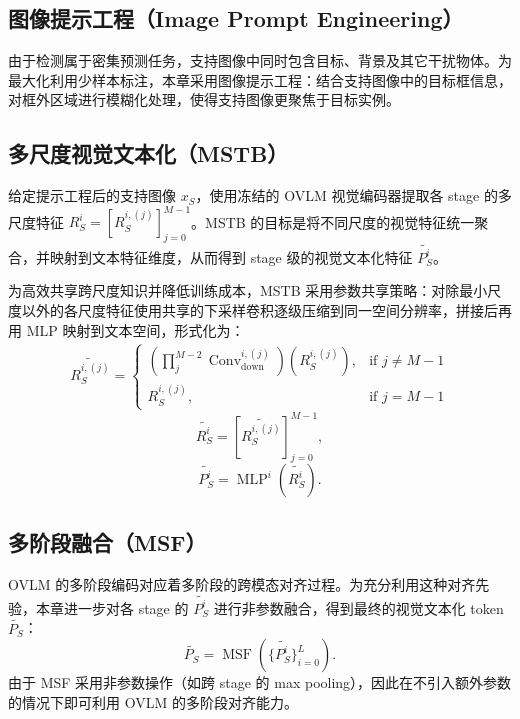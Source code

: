 \subsection{图像提示工程（Image Prompt Engineering）}
由于检测属于密集预测任务，支持图像中同时包含目标、背景及其它干扰物体。为最大化利用少样本标注，本章采用图像提示工程：结合支持图像中的目标框信息，对框外区域进行模糊化处理，使得支持图像更聚焦于目标实例\cite{luddecke2022clipseg}。

\subsection{多尺度视觉文本化（MSTB）}
给定提示工程后的支持图像 $x_S$，使用冻结的 OVLM 视觉编码器提取各 stage 的多尺度特征 $R^i_S=\left[R_S^{i,(j)}\right]_{j=0}^{M-1}$。MSTB 的目标是将不同尺度的视觉特征统一聚合，并映射到文本特征维度，从而得到 stage 级的视觉文本化特征 $\widetilde{P^i_S}$。

为高效共享跨尺度知识并降低训练成本，MSTB 采用参数共享策略：对除最小尺度以外的各尺度特征使用共享的下采样卷积逐级压缩到同一空间分辨率，拼接后再用 MLP 映射到文本空间，形式化为：
\begin{equation}
\begin{aligned}
    \widetilde{R^{i,(j)}_S} = \left\{
    \begin{array}{ll}
    \left( \prod_{j}^{M-2} \operatorname{Conv}_{\text{down}}^{i,(j)}\right) \left( R^{i,(j)}_S \right), & \text{if } j \neq M-1 \\
    R^{i,(j)}_S, & \text{if } j = M-1
    \end{array}
    \right.
\end{aligned}
\label{eq:vistex_downsample}
\end{equation}
\begin{equation}
    \widetilde{R^i_S} = \left[ \widetilde{R^{i,(j)}_S} \right]_{j=0}^{M-1},
\label{eq:vistex_concat}
\end{equation}
\begin{equation}
    \widetilde{P^i_S} = \operatorname{MLP}^i \left( \widetilde{R^i_S} \right).
\label{eq:vistex_mlp}
\end{equation}

\subsection{多阶段融合（MSF）}
OVLM 的多阶段编码对应着多阶段的跨模态对齐过程。为充分利用这种对齐先验，本章进一步对各 stage 的 $\widetilde{P^i_S}$ 进行非参数融合，得到最终的视觉文本化 token $\widetilde{P_S}$：
\begin{equation}
    \widetilde{P_S} = \operatorname{MSF} \left( \{ \widetilde{P^i_S}\}_{i=0}^L \right).
\label{eq:vistex_msf}
\end{equation}
由于 MSF 采用非参数操作（如跨 stage 的 max pooling），因此在不引入额外参数的情况下即可利用 OVLM 的多阶段对齐能力。

